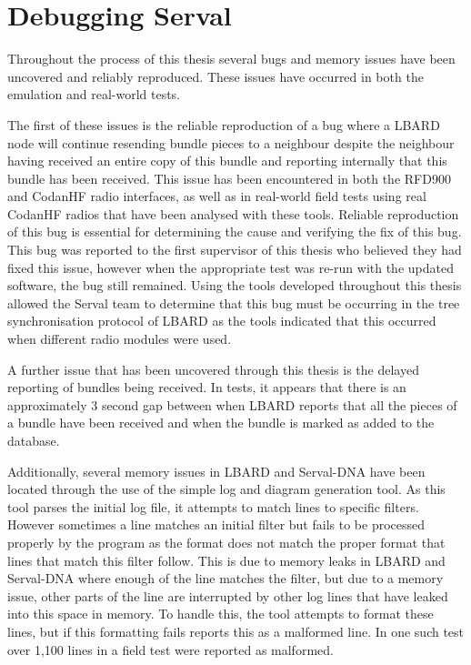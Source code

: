 \section{Debugging Serval}
Throughout the process of this thesis several bugs and memory issues have been uncovered and reliably reproduced.
These issues have occurred in both the emulation and real-world tests.

The first of these issues is the reliable reproduction of a bug where a LBARD node will continue resending bundle pieces to a neighbour despite the neighbour having received an entire copy of this bundle and reporting internally that this bundle has been received.
This issue has been encountered in both the RFD900 and CodanHF radio interfaces, as well as in real-world field tests using real CodanHF radios that have been analysed with these tools.
Reliable reproduction of this bug is essential for determining the cause and verifying the fix of this bug.
This bug was reported to the first supervisor of this thesis who believed they had fixed this issue, however when the appropriate test was re-run with the updated software, the bug still remained.
Using the tools developed throughout this thesis allowed the Serval team to determine that this bug must be occurring in the tree synchronisation protocol of LBARD as the tools indicated that this occurred when different radio modules were used.

A further issue that has been uncovered through this thesis is the delayed reporting of bundles being received.
In tests, it appears that there is an approximately 3 second gap between when LBARD reports that all the pieces of a bundle have been received and when the bundle is marked as added to the database.

Additionally, several memory issues in LBARD and Serval-DNA have been located through the use of the simple log and diagram generation tool.
As this tool parses the initial log file, it attempts to match lines to specific filters.
However sometimes a line matches an initial filter but fails to be processed properly by the program as the format does not match the proper format that lines that match this filter follow.
This is due to memory leaks in LBARD and Serval-DNA where enough of the line matches the filter, but due to a memory issue, other parts of the line are interrupted by other log lines that have leaked into this space in memory.
To handle this, the tool attempts to format these lines, but if this formatting fails reports this as a malformed line.
In one such test over 1,100 lines in a field test were reported as malformed.


